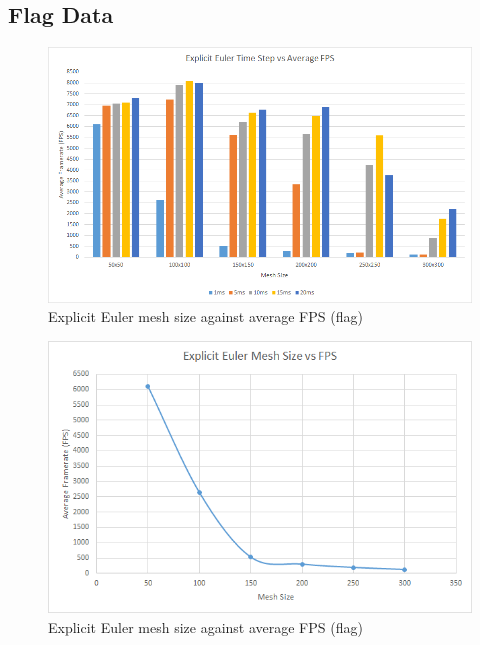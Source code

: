 \begin{landscape}
\subsection{Flag Data}

    \begin{figure}[!htb]
    \begin{center}
      \includegraphics[scale=0.95]{Figures/flag_ee_fps}
    \end{center}
    \caption{Explicit Euler mesh size against average FPS (flag)}
    \label{fig:ee fps flag}
  \end{figure}
\end{landscape}
  
    \begin{figure}
    \begin{center}
      \includegraphics[scale=.9]{Figures/flag_ee_m_fps}
    \end{center}
    \caption{Explicit Euler mesh size against average FPS (flag)}
    \label{fig:ee mesh fps flag}
  \end{figure}
  
